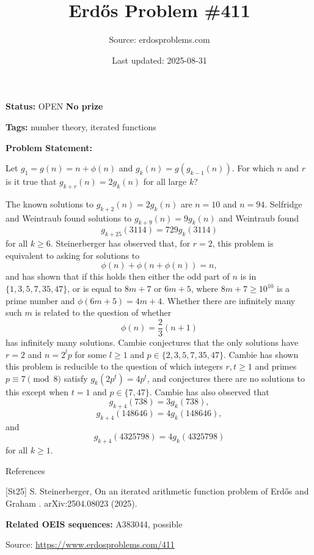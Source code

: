\documentclass{article}
\title{Erd\H{o}s Problem \#411}
\date{Last updated: 2025-08-31}
\author{Source: erdosproblems.com}
\begin{document}
\maketitle

\noindent\textbf{Status:} OPEN \quad \textbf{No prize}

\noindent\textbf{Tags:} number theory, iterated functions

\medskip

\noindent\textbf{Problem Statement:}

Let $g_1=g(n)=n+\phi(n)$ and $g_k(n)=g(g_{k-1}(n))$. For which $n$ and $r$ is it true that $g_{k+r}(n)=2g_k(n)$ for all large $k$?




The known solutions to $g_{k+2}(n)=2g_k(n)$ are $n=10$ and $n=94$. Selfridge and Weintraub found solutions to $g_{k+9}(n)=9g_k(n)$ and Weintraub found\[g_{k+25}(3114)=729g_k(3114)\]for all $k\geq 6$. Steinerberger \cite{St25} has observed that, for $r=2$, this problem is equivalent to asking for solutions to\[\phi(n)+\phi(n+\phi(n))=n,\]and has shown that if this holds then either the odd part of $n$ is in $\{1,3,5,7,35,47\}$, or is equal to $8m+7$ or $6m+5$, where $8m+7\geq 10^{10}$ is a prime number and $\phi(6m+5)=4m+4$. Whether there are infinitely many such $m$ is related to the question of whether\[\phi(n)=\frac{2}{3}(n+1)\]has infinitely many solutions. Cambie conjectures that the only solutions have $r=2$ and $n=2^lp$ for some $l\geq 1$ and $p\in \{2,3,5,7,35,47\}$. Cambie has shown this problem is reducible to the question of which integers $r,t\geq 1$ and primes $p\equiv 7\pmod{8}$ satisfy $g_k(2p^t)=4p^t$, and conjectures there are no solutions to this except when $t=1$ and $p\in \{7,47\}$. Cambie has also observed that\[g_{k+4}(738)=3g_k(738),\]\[g_{k+4}(148646)=4g_k(148646),\]and\[g_{k+4}(4325798)=4g_{k}(4325798)\]for all $k\geq 1$.




References

[St25] S. Steinerberger, On an iterated arithmetic function problem of Erd\H{o}s and Graham . arXiv:2504.08023 (2025).

\noindent\textbf{Related OEIS sequences:} A383044, possible


\bigskip
\noindent\small{Source: \url{https://www.erdosproblems.com/411}}
\end{document}
